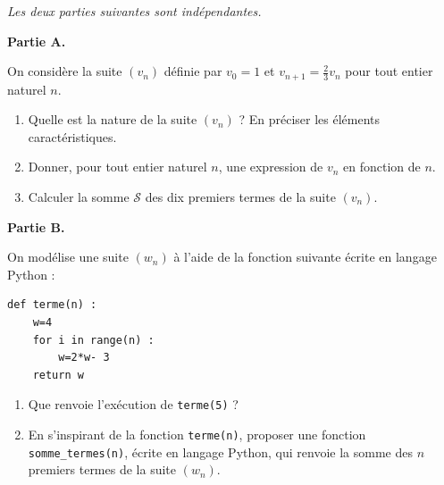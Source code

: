 \medskip

\emph{Les deux parties suivantes sont indépendantes.}

\medskip

\textbf{Partie A.} 

\medskip

On considère la suite $\left(v_n\right)$ définie par $v_0=1$ et $v_{n+1} = \frac{2}{3}v_n$ pour tout entier naturel $n$.

\medskip

\begin{enumerate}
\item Quelle est la nature de la suite $\left(v_n\right)$ ? En préciser les éléments caractéristiques.
\item Donner, pour tout entier naturel $n$, une expression de $v_n$ en fonction de $n$.
\item Calculer la somme $\mathscr{S}$ des dix premiers termes de la suite $\left(v_n\right)$.
\end{enumerate}
\medskip

\textbf{Partie B.}

\medskip

On modélise une suite $\left(w_n\right)$ à l'aide de la fonction suivante écrite en langage Python :

\begin{lstlisting}[style=python]
def terme(n) :
	w=4
	for i in range(n) :
		w=2*w- 3
	return w
   \end{lstlisting}

\begin{enumerate}[resume]
\item Que renvoie l'exécution de \verb|terme(5)| ?
\item En s'inspirant de la fonction \verb|terme(n)|, proposer une fonction \verb|somme_termes(n)|, écrite en langage Python, qui renvoie la somme des $n$ premiers termes de la suite 
$\left(w_n\right)$.
\end{enumerate}

\vspace{0,5cm}
